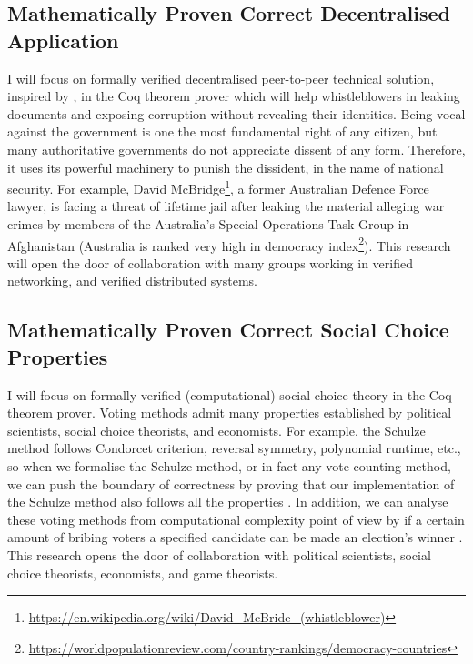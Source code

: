 \documentclass[a4paper]{article}
\begin{document}
\subsection{Mathematically Proven Correct Decentralised Application}
I will focus on formally verified decentralised peer-to-peer technical solution, inspired by 
\cite{liu2004linkable, Clarke2001, schimmer2009peer, 10.1145/1866307.1866346}, in the Coq theorem prover which will help 
whistleblowers in leaking documents and exposing corruption without revealing their identities.
Being vocal against the government is one the most fundamental right of any citizen, but many 
authoritative governments do not appreciate dissent of any form. Therefore, it uses 
its powerful machinery to punish the dissident, in the name of national security. 
For example, David McBridge\footnote{\url{https://en.wikipedia.org/wiki/David_McBride_(whistleblower)}}, 
a former Australian Defence Force lawyer,  
is facing a threat of lifetime jail after
leaking the material alleging war crimes by members of the Australia's Special Operations
Task Group in Afghanistan (Australia is ranked very high in 
democracy index\footnote{\url{https://worldpopulationreview.com/country-rankings/democracy-countries}}). 
This research will open the door of collaboration with many groups working in verified 
networking, and verified distributed systems. 

\subsection{Mathematically Proven Correct Social Choice Properties}
I will focus on formally verified (computational) social choice theory in the Coq theorem prover. 
Voting methods admit many properties established by political scientists, social choice theorists, 
and economists. For example, the Schulze method follows Condorcet criterion, reversal symmetry,
polynomial runtime, etc., so when we formalise the Schulze method, or in fact any vote-counting method, 
we can push the boundary of correctness by proving that our 
implementation of the Schulze method also follows all the properties \cite{tiwari2021machine}. 
In addition, we can analyse these voting
methods from computational complexity point of view by if a certain amount of bribing
voters a specified candidate can be made an election's winner \cite{faliszewski2006complexity}. 
This research opens the door of collaboration with political scientists, 
social choice theorists, economists, and game theorists.
\end{document}
